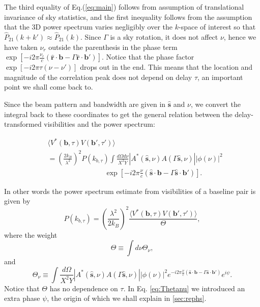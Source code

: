 \documentclass[twocolumn,apj,numberedappendix]{emulateapj}
\renewcommand\[{\begin{equation}}
\renewcommand\]{\end{equation}}
\begin{document}
The third equality of Eq.(\ref{eq:main}) follows from assumption of translational invariance of sky statistics, and the first inequality follows from the assumption that
the 3D power spectrum varies negligibly over the $k$-space of interest
so that $\hat{P}_{21}(k+k')\approx\hat{P}_{21}(k)$. Since $\Gamma$
is a sky rotation, it does not affect $\nu$, hence we have taken $\nu_{r}$
outside the parenthesis in the phase term $\exp\left[-i2\pi\frac{\nu_{r}}{c}\left(\hat{\boldsymbol{r}}\cdot\boldsymbol{b}-\Gamma \hat{\boldsymbol{r}}\cdot\boldsymbol{b'}\right)\right]$. Notice that the phase factor $\exp\left[-i2\pi\tau\left(\nu-\nu'\right)\right]$
drops out in the end. This means that the location and magnitude of the correlation peak does not depend on delay $\tau$, an important point we shall come back to. 

Since the beam pattern and bandwidth are given in $\hat{\boldsymbol{s}}$
and $\nu$, we convert the integral back to these coordinates to get
the general relation between the delay-transformed visibilities and
the power spectrum:

\begin{equation}
\begin{aligned} & \langle V^{*}(\boldsymbol{b},\tau)V(\boldsymbol{b'},\tau')\rangle\\
 & =\left(\frac{2k_{B}}{\lambda^{2}}\right)^{2}P(k_{b,\tau})\int\frac{d\Omega d\nu}{X^{2}Y}|A^{*}(\hat{\boldsymbol{s}},\nu)A(\Gamma\hat{\boldsymbol{s}},\nu)||\phi(\nu)|^{2}\\
 & \qquad \qquad \qquad \qquad \exp\left[-i2\pi\frac{\nu}{c}\left(\hat{\boldsymbol{s}}\cdot\boldsymbol{b}-\Gamma\hat{\boldsymbol{s}}\cdot\boldsymbol{b'}\right)\right].\end{aligned}
\label{eq:final}
\end{equation}

In other words the power spectrum estimate from visibilities of a baseline pair is given by 
\begin{equation}
 P(k_{b,\tau}) = \left(\frac{\lambda^{2}}{2k_{B}}\right)^{2} \frac{\langle V^{*}(\boldsymbol{b},\tau)V(\boldsymbol{b'},\tau')\rangle}{\Theta}, 
 \label{eq:opp}
\end{equation}
where the weight
\begin{equation}
\Theta \equiv\int d\nu \Theta_{\nu}, 
\label{eq:Theta}
\end{equation}
and 
\[
\Theta_{\nu}\equiv \int \frac{d\Omega}{X^{2}Y}|A^{*}(\hat{\boldsymbol{s}},\nu)A(\Gamma\hat{\boldsymbol{s}},\nu)||\phi(\nu)|^{2} e^{-i2\pi\frac{\nu}{c}\left(\hat{\boldsymbol{s}}\cdot\boldsymbol{b}-\Gamma\hat{\boldsymbol{s}}\cdot\boldsymbol{b'}\right)}e^{i\psi}.
\label{eq:Thetanu}
\]
Notice that $\Theta$ has no dependence on $\tau$. In Eq. \ref{eq:Thetanu} we introduced an extra phase $\psi$, the origin of which we shall explain in \ref{sec:rephs}. 
\end{document}
